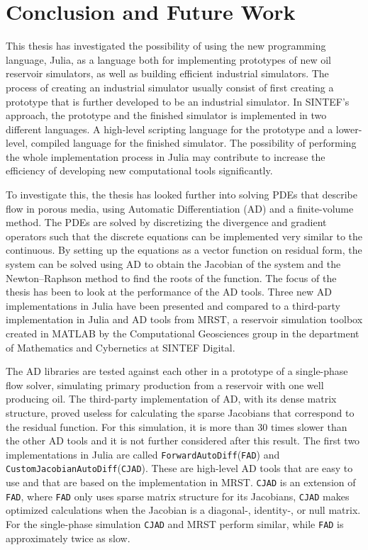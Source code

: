 \chapter{Conclusion and Future Work}
\label{ch:Conclusion}
This thesis has investigated the possibility of using the new programming language, Julia, as a language both for implementing prototypes of new oil reservoir simulators, as well as building efficient industrial simulators. The process of creating an industrial simulator usually consist of first creating a prototype that is further developed to be an industrial simulator. In SINTEF's approach, the prototype and the finished simulator is implemented in two different languages. A high-level scripting language for the prototype and a lower-level, compiled language for the finished simulator. The possibility of performing the whole implementation process in Julia may contribute to increase the efficiency of developing new computational tools significantly.

To investigate this, the thesis has looked further into solving PDEs that describe flow in porous media, using Automatic Differentiation (AD) and a finite-volume method. The PDEs are solved by discretizing the divergence and gradient operators such that the discrete equations can be implemented very similar to the continuous. By setting up the equations as a vector function on residual form, the system can be solved using AD to obtain the Jacobian of the system and the Newton--Raphson method to find the roots of the function. The focus of the thesis has been to look at the performance of the AD tools. Three new AD implementations in Julia have been presented and compared to a third-party implementation in Julia and AD tools from MRST, a reservoir simulation toolbox created in MATLAB by the Computational Geosciences group in the department of Mathematics and Cybernetics at SINTEF Digital\emph{\citep{mrstHomepage}}. 

The AD libraries are tested against each other in a prototype of a single-phase flow solver, simulating primary production from a reservoir with one well producing oil. The third-party implementation of AD, with its dense matrix structure, proved useless for calculating the sparse Jacobians that correspond to the residual function. For this simulation, it is more than 30 times slower than the other AD tools and it is not further considered after this result. The first two implementations in Julia are called \texttt{ForwardAutoDiff}(\texttt{FAD}) and \texttt{CustomJacobianAutoDiff}(\texttt{CJAD}). These are high-level AD tools that are easy to use and that are based on the implementation in MRST. \texttt{CJAD} is an extension of \texttt{FAD}, where \texttt{FAD} only uses sparse matrix structure for its Jacobians, \texttt{CJAD} makes optimized calculations when the Jacobian is a diagonal-, identity-, or null matrix. For the single-phase simulation \texttt{CJAD} and MRST perform similar, while \texttt{FAD} is approximately twice as slow. 

